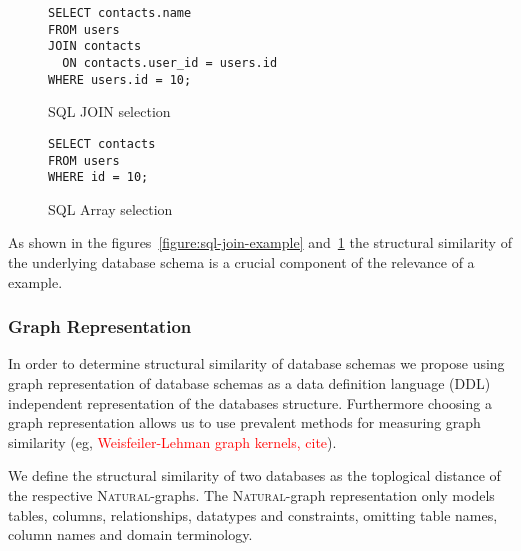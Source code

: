 \begin{figure}[ht]
  \vspace{1em}
  \hfill
  \begin{minipage}[b]{0.45\linewidth}
    \begin{verbatim}
SELECT contacts.name
FROM users
JOIN contacts
  ON contacts.user_id = users.id
WHERE users.id = 10;
    \end{verbatim}
    \caption{SQL JOIN selection}
    \label{figure:sql-join-example}
  \end{minipage}
  \hfill
  \begin{minipage}[b]{0.35\linewidth}
    \centering
    \begin{verbatim}
SELECT contacts
FROM users
WHERE id = 10;
    \end{verbatim}
    \vspace{1.3em}
    \caption{SQL Array selection}
    \label{figure:sql-array-example}
  \end{minipage}
  \hfill
  \vspace{1em}
\end{figure}


As shown in the figures~\ref{figure:sql-join-example} and~\ref{figure:sql-array-example}
the structural similarity of the underlying database schema is a crucial component
of the relevance of a example.

\subsubsection{Graph Representation}

In order to determine structural similarity of database schemas we propose using
graph representation of database schemas as a data definition language (DDL)
independent representation of the databases structure. Furthermore choosing a graph
representation allows us to use prevalent methods for measuring graph similarity
(eg, \textcolor{red}{Weisfeiler-Lehman graph kernels, cite}).

We define the structural similarity of two databases as the toplogical distance
of the respective \textsc{Natural}-graphs. The \textsc{Natural}-graph representation
only models tables, columns, relationships, datatypes and constraints, omitting 
table names, column names and domain terminology.

